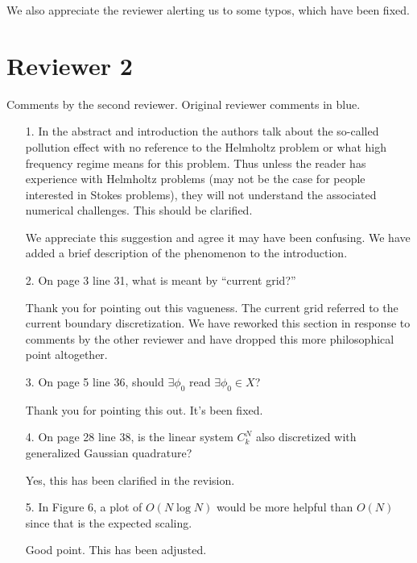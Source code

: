 \documentclass{article}
\begin{document}
We also appreciate the reviewer alerting us to some typos, which have
been fixed.

\section{Reviewer 2}


Comments by the second reviewer. Original reviewer comments
in {\color{blue} blue}.

\begin{itemize}
\item[1.] {\color{blue} In the abstract and introduction the authors talk about the so-called pollution effect
with no reference to the Helmholtz problem or what high frequency regime means for
this problem. Thus unless the reader has experience with Helmholtz problems (may
not be the case for people interested in Stokes problems), they will not understand the
associated numerical challenges. This should be clarified.}

  We appreciate this suggestion and agree it may have been confusing.
  We have added a brief description of the phenomenon to the
  introduction.
  
\item[2.] {\color{blue} On page 3 line 31, what is meant by “current grid?”}

  Thank you for pointing out this vagueness. The current grid referred
  to the current boundary discretization. We have reworked this section
  in response to comments by the other reviewer and have dropped this more
  philosophical point altogether.
  
\item[3.] {\color{blue} On page 5 line 36, should $\exists \phi_0$ read $\exists \phi_0 \in X$?}

  Thank you for pointing this out. It's been fixed.
  
\item[4.] {\color{blue} On page 28 line 38, is the linear system $C_k^N$
  also discretized with generalized Gaussian quadrature?}

  Yes, this has been clarified in the revision.
  
\item[5.] {\color{blue} In Figure 6, a plot of $O(N \log N )$
  would be more helpful than $O(N )$ since that is the expected scaling.}

  Good point. This has been adjusted.
  
\end{itemize}
\end{document}
